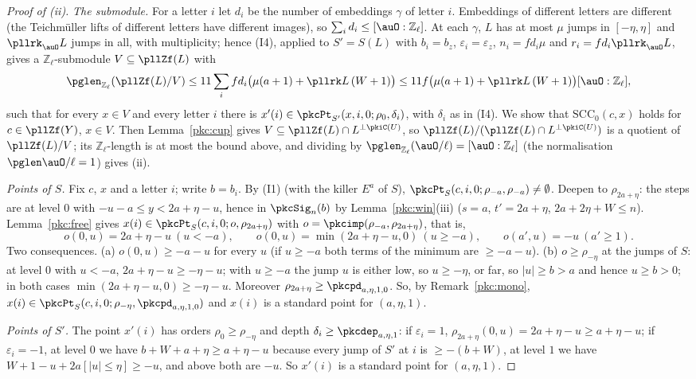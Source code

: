 \documentclass[10pt]{amsart}
\theoremstyle{definition}
\theoremstyle{remark}
\newcommand{\Z}{\mathbb Z}
\begin{document}
\begin{proof}[Proof of (ii)]
\emph{The submodule.} For a letter $i$ let $d_i$ be the number of embeddings $\gamma$ of letter $i$.
Embeddings of different letters are different (the Teichm\"uller lifts of different letters have
different images), so $\sum_id_i\le[\auO:\Z_\ell]$. At each $\gamma$, $L$ has at most $\mu$ jumps in
$[-\eta,\eta]$ and $\pllrk_\auO L$ jumps in all, with multiplicity; hence (I4), applied to $S'=S(L)$ with
$b_i=b_z$, $\varepsilon_i=\varepsilon_z$, $n_i=fd_i\mu$ and $r_i=fd_i\pllrk_\auO L$, gives a
$\Z_\ell$-submodule $V\subseteq\pllZf(L)$ with
\[
\pglen_{\Z_\ell}(\pllZf(L)/V)\le11\sum_ifd_i\bigl(\mu(a+1)+\pllrk L\,(W+1)\bigr)\le
11f\bigl(\mu(a+1)+\pllrk L\,(W+1)\bigr)[\auO:\Z_\ell],
\]
such that for every $x\in V$ and every letter $i$ there is $x'(i)\in\pkcPt_{S'}(x,i,0;\rho_0,\delta_i)$,
with $\delta_i$ as in (I4). We show that $\mathrm{SCC}_0(c,x)$ holds for $c\in\pllZf(Y)$, $x\in V$.
Then Lemma~\ref{pkc:cup} gives $V\subseteq\pllZf(L)\cap L^{\perp\pkiC(U)}$, so
$\pllZf(L)/(\pllZf(L)\cap L^{\perp\pkiC(U)})$ is a quotient of $\pllZf(L)/V$; its $\Z_\ell$-length is
at most the bound above, and dividing by $\pglen_{\Z_\ell}(\auO/\ell)=[\auO:\Z_\ell]$ (the
normalisation $\pglen\auO/\ell=1$) gives (ii).

\emph{Points of $S$.} Fix $c$, $x$ and a letter $i$; write $b=b_i$. By (I1) (with the killer $E^a$ of
$S$), $\pkcPt_S(c,i,0;\rho_{-a},\rho_{-a})\ne\emptyset$. Deepen to $\rho_{2a+\eta}$: the steps are at
level $0$ with $-u-a\le y<2a+\eta-u$, hence in $\pkcSig_n(b)$ by Lemma~\ref{pkc:win}(iii) ($s=a$,
$t'=2a+\eta$, $2a+2\eta+W\le n$). Lemma~\ref{pkc:free} gives $x(i)\in\pkcPt_S(c,i,0;o,\rho_{2a+\eta})$
with $o=\pkcimp(\rho_{-a},\rho_{2a+\eta})$, that is,
\[
o(0,u)=2a+\eta-u\ (u<-a),\qquad o(0,u)=\min(2a+\eta-u,0)\ (u\ge-a),\qquad o(a',u)=-u\ (a'\ge1).
\]
Two consequences. (a) $o(0,u)\ge-a-u$ for every $u$ (if $u\ge-a$ both terms of the minimum are $\ge-a-u$).
(b) $o\ge\rho_{-\eta}$ at the jumps of $S$: at level $0$ with $u<-a$, $2a+\eta-u\ge-\eta-u$; with $u\ge-a$
the jump $u$ is either low, so $u\ge-\eta$, or far, so $|u|\ge b>a$ and hence $u\ge b>0$; in both cases
$\min(2a+\eta-u,0)\ge-\eta-u$. Moreover $\rho_{2a+\eta}\ge\pkcpd_{a,\eta,1,0}$. So, by
Remark~\ref{pkc:mono}, $x(i)\in\pkcPt_S(c,i,0;\rho_{-\eta},\pkcpd_{a,\eta,1,0})$ and $x(i)$ is a standard
point for $(a,\eta,1)$.

\emph{Points of $S'$.} The point $x'(i)$ has orders $\rho_0\ge\rho_{-\eta}$ and depth
$\delta_i\ge\pkcdep_{a,\eta,1}$: if $\varepsilon_i=1$, $\rho_{2a+\eta}(0,u)=2a+\eta-u\ge a+\eta-u$; if
$\varepsilon_i=-1$, at level $0$ we have $b+W+a+\eta\ge a+\eta-u$ because every jump of $S'$ at $i$ is
$\ge-(b+W)$, at level $1$ we have $W+1-u+2a[|u|\le\eta]\ge-u$, and above both are $-u$. So $x'(i)$ is a
standard point for $(a,\eta,1)$.


\end{proof}
\end{document}
